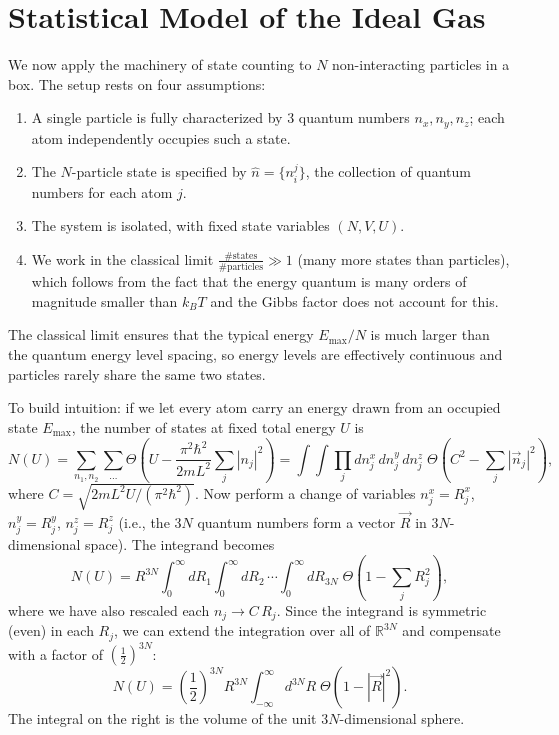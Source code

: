 \chapter{Statistical Model of the Ideal Gas}

We now apply the machinery of state counting to $N$ non-interacting particles in a box. The setup rests on four assumptions:
\begin{enumerate}
    \item A single particle is fully characterized by 3 quantum numbers $n_x, n_y, n_z$; each atom independently occupies such a state.
    \item The $N$-particle state is specified by $\hat{n} = \{n_i^j\}$, the collection of quantum numbers for each atom $j$.
    \item The system is isolated, with fixed state variables $(N, V, U)$.
    \item We work in the classical limit $\frac{\text{\# states}}{\text{\# particles}} \gg 1$ (many more states than particles), which follows from the fact that the energy quantum is many orders of magnitude smaller than $k_BT$ and the Gibbs factor does not account for this.
\end{enumerate}

The classical limit ensures that the typical energy $E_{\max}/N$ is much larger than the quantum energy level spacing, so energy levels are effectively continuous and particles rarely share the same two states.

To build intuition: if we let every atom carry an energy drawn from an occupied state $E_{\max}$, the number of states at fixed total energy $U$ is
\begin{equation}
    N(U) = \sum_{n_1, n_2} \sum_{\ldots} \Theta\!\left(U - \frac{\pi^2\hbar^2}{2mL^2}\sum_j |n_j|^2\right)
    = \int\!\!\int \prod_j dn_j^x\,dn_j^y\,dn_j^z\;\Theta\!\left(C^2 - \sum_j |\vec{n}_j|^2\right),
\end{equation}
where $C = \sqrt{2mL^2 U/(\pi^2\hbar^2)}$. Now perform a change of variables $n_j^x = R_j^x$, $n_j^y = R_j^y$, $n_j^z = R_j^z$ (i.e., the $3N$ quantum numbers form a vector $\vec{R}$ in $3N$-dimensional space). The integrand becomes
\begin{equation}
    N(U) = R^{3N}\int_0^\infty dR_1\int_0^\infty dR_2\,\cdots\int_0^\infty dR_{3N}\;\Theta\!\left(1 - \sum_j R_j^2\right),
\end{equation}
where we have also rescaled each $n_j \to C\,R_j$. Since the integrand is symmetric (even) in each $R_j$, we can extend the integration over all of $\mathbb{R}^{3N}$ and compensate with a factor of $(\tfrac{1}{2})^{3N}$:
\begin{equation}
    N(U) = \left(\frac{1}{2}\right)^{3N} R^{3N} \int_{-\infty}^{\infty} d^{3N}R\;\Theta\!\left(1 - |\vec{R}|^2\right).
\end{equation}
The integral on the right is the volume of the unit $3N$-dimensional sphere.


